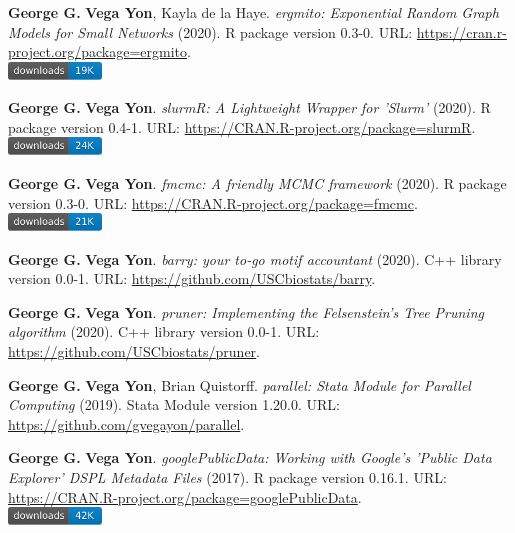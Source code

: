 \item \textbf{George G.} \textbf{Vega Yon}, Kayla de la Haye. \textit{ergmito: Exponential Random Graph Models for Small Networks} (2020). R package version 0.3-0. {\small URL}: \url{https://cran.r-project.org/package=ergmito}. \\\includegraphics[width=2.5cm]{fig/cran-downloads-ergmito.pdf} 
\item \textbf{George G.} \textbf{Vega Yon}. \textit{slurmR: A Lightweight Wrapper for 'Slurm'} (2020). R package version 0.4-1. {\small URL}: \url{https://CRAN.R-project.org/package=slurmR}. \\\includegraphics[width=2.5cm]{fig/cran-downloads-slurmr.pdf} 
\item \textbf{George G.} \textbf{Vega Yon}. \textit{fmcmc: A friendly MCMC framework} (2020). R package version 0.3-0. {\small URL}: \url{https://CRAN.R-project.org/package=fmcmc}. \\\includegraphics[width=2.5cm]{fig/cran-downloads-fmcmc.pdf} 
\item \textbf{George G.} \textbf{Vega Yon}. \textit{barry: your to-go motif accountant} (2020). C++ library version 0.0-1. {\small URL}: \url{https://github.com/USCbiostats/barry}.  
\item \textbf{George G.} \textbf{Vega Yon}. \textit{pruner: Implementing the Felsenstein's Tree Pruning algorithm} (2020). C++ library version 0.0-1. {\small URL}: \url{https://github.com/USCbiostats/pruner}.  
\item \textbf{George G.} \textbf{Vega Yon}, Brian Quistorff. \textit{parallel: Stata Module for Parallel Computing} (2019). Stata Module version 1.20.0. {\small URL}: \url{https://github.com/gvegayon/parallel}.  
\item \textbf{George G.} \textbf{Vega Yon}. \textit{googlePublicData: Working with Google's 'Public Data Explorer' DSPL Metadata Files} (2017). R package version 0.16.1. {\small URL}: \url{https://CRAN.R-project.org/package=googlePublicData}. \\\includegraphics[width=2.5cm]{fig/cran-downloads-googlepublicdata.pdf} 
